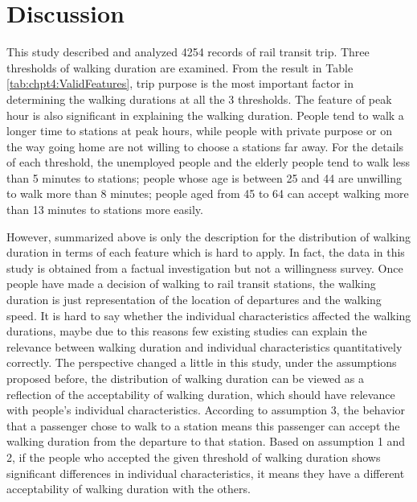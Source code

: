%
\section{Discussion}
This study described and analyzed 4254 records of rail transit trip. Three thresholds of walking duration are examined. From the result in Table \ref{tab:chpt4:ValidFeatures}, trip purpose is the most important factor in determining the walking durations at all the 3 thresholds. The feature of peak hour is also significant in explaining the walking duration. People tend to walk a longer time to stations at peak hours, while people with private purpose or on the way going home are not willing to choose a stations far away. For the details of each threshold, the unemployed people and the elderly people tend to walk less than 5 minutes to stations; people whose age is between 25 and 44 are unwilling to walk more than 8 minutes; people aged from 45 to 64 can accept walking more than 13 minutes to stations more easily.

%
However, summarized above is only the description for the distribution of walking duration in terms of each feature which is hard to apply. In fact, the data in this study is obtained from a factual investigation but not a willingness survey. Once people have made a decision of walking to rail transit stations, the walking duration is just representation of the location of departures and the walking speed. It is hard to say whether the individual characteristics affected the walking durations, maybe due to this reasons few existing studies can explain the relevance between walking duration and individual characteristics quantitatively correctly. The perspective changed a little in this study, under the assumptions proposed before, the distribution of walking duration can be viewed as a reflection of the acceptability of walking duration, which should have relevance with people's individual characteristics. According to assumption 3, the behavior that a passenger chose to walk to a station means this passenger can accept the walking duration from the departure to that station. Based on assumption 1 and 2, if the people who accepted the given threshold of walking duration shows significant differences in individual characteristics, it means they have a different acceptability of walking duration with the others.


